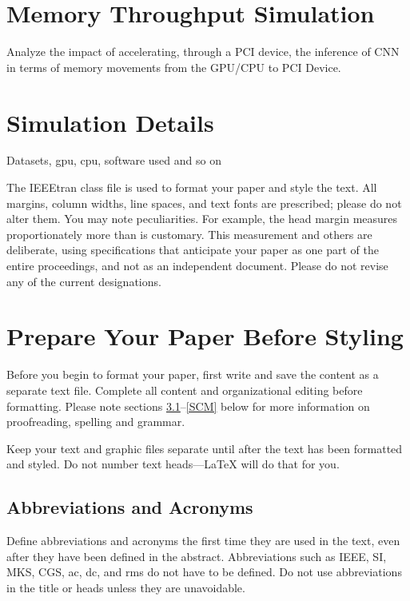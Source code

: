 \documentclass[conference]{IEEEtran}
\begin{document}
\section{Memory Throughput Simulation}
Analyze the impact of accelerating, through a PCI device, the inference of CNN in terms of memory movements from the GPU/CPU to PCI Device.


\section{Simulation Details}
Datasets, gpu, cpu, software used and so on

The IEEEtran class file is used to format your paper and style the text. All margins, 
column widths, line spaces, and text fonts are prescribed; please do not 
alter them. You may note peculiarities. For example, the head margin
measures proportionately more than is customary. This measurement 
and others are deliberate, using specifications that anticipate your paper 
as one part of the entire proceedings, and not as an independent document. 
Please do not revise any of the current designations.

\section{Prepare Your Paper Before Styling}
Before you begin to format your paper, first write and save the content as a 
separate text file. Complete all content and organizational editing before 
formatting. Please note sections \ref{AA}--\ref{SCM} below for more information on 
proofreading, spelling and grammar.

Keep your text and graphic files separate until after the text has been 
formatted and styled. Do not number text heads---{\LaTeX} will do that 
for you.

\subsection{Abbreviations and Acronyms}\label{AA}
Define abbreviations and acronyms the first time they are used in the text, 
even after they have been defined in the abstract. Abbreviations such as 
IEEE, SI, MKS, CGS, ac, dc, and rms do not have to be defined. Do not use 
abbreviations in the title or heads unless they are unavoidable.
\end{document}
